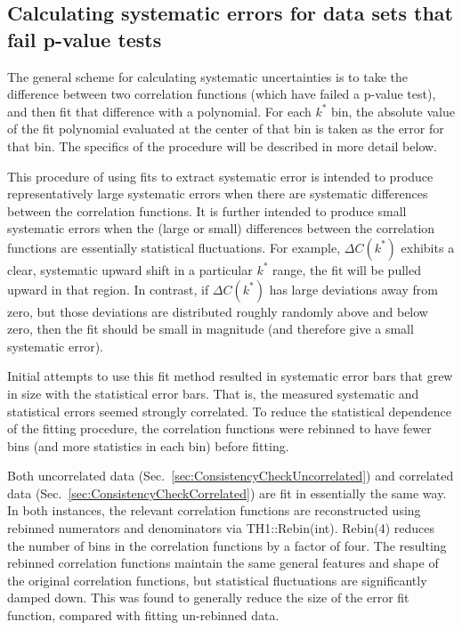 \subsection{Calculating systematic errors for data sets that fail p-value tests}
\label{sec:CalculatingSysErrors}

The general scheme for calculating systematic uncertainties is to take the difference between two correlation functions (which have failed a p-value test), and then fit that difference with a polynomial.  For each $k^*$ bin, the absolute value of the fit polynomial evaluated at the center of that bin is taken as the error for that bin.  The specifics of the procedure will be described in more detail below.

This procedure of using fits to extract systematic error is intended to produce representatively large systematic errors when there are systematic differences between the correlation functions.  It is further intended to produce small systematic errors when the (large or small) differences between the correlation functions are essentially statistical fluctuations.  For example, $\Delta C(k^*)$ exhibits a clear, systematic upward shift in a particular $k^*$ range, the fit will be pulled upward in that region.  In contrast, if $\Delta C(k^*)$ has large deviations away from zero, but those deviations are distributed roughly randomly above and below zero, then the fit should be small in magnitude (and therefore give a small systematic error).   

Initial attempts to use this fit method resulted in systematic error bars that grew in size with the statistical error bars.  That is, the measured systematic and statistical errors seemed strongly correlated.  To reduce the statistical dependence of the fitting procedure, the correlation functions were rebinned to have fewer bins (and more statistics in each bin) before fitting.

Both uncorrelated data (Sec.\ \ref{sec:ConsistencyCheckUncorrelated}) and correlated data (Sec.\ \ref{sec:ConsistencyCheckCorrelated}) are fit in essentially the same way.  In both instances, the relevant correlation functions are reconstructed using rebinned numerators and denominators via TH1::Rebin(int).  Rebin(4) reduces the number of bins in the correlation functions by a factor of four.  The resulting rebinned correlation functions maintain the same general features and shape of the original correlation functions, but statistical fluctuations are significantly damped down. This was found to generally reduce the size of the error fit function, compared with fitting un-rebinned data.  

